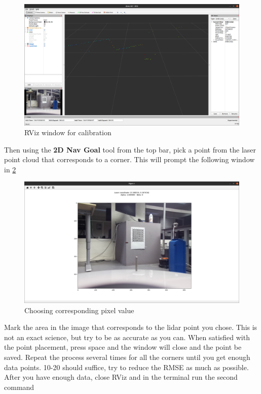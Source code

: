 \begin{figure}[H]
    \centering
    \includegraphics[width=\textwidth]{Images/actual-laz-cal.png}
    \caption{RViz window for calibration}
    \label{fig:yup}
\end{figure}

Then using the \textbf{2D Nav Goal} tool from the top bar, pick a point from the laser point cloud that corresponds to a corner. This will prompt the following window in \cref{fig:pixel-value}


\begin{figure}[H]
    \centering
    \includegraphics[width=\textwidth]{Images/choose-point.png}
    \caption{Choosing corresponding pixel value}
    \label{fig:pixel-value}
\end{figure}

Mark the area in the image that corresponds to the lidar point you chose. This is not an exact science, but try to be as accurate as you can. When satisfied with the point placement, press space and the window will close and the point be saved. Repeat the process several times for all the corners until you get enough data points. 10-20 should suffice, try to reduce the RMSE as much as possible. After you have enough data, close RViz and in the terminal run the second command

